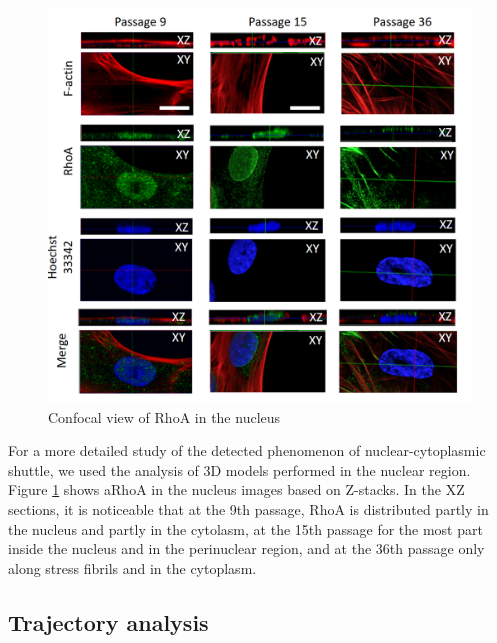 \documentclass[english,authoryear]{elsarticle}
\begin{document}
\begin{figure}
  \includegraphics[width=0.9\linewidth]{fig_rho-3d.png}
  \caption{Confocal view of RhoA in the nucleus}
  \label{rho-3d}
  \centering
\end{figure}

For a more detailed study of the detected phenomenon of nuclear-cytoplasmic shuttle, we used the analysis of 3D models performed in the nuclear region.
Figure \ref{rho-3d} shows aRhoA in the nucleus images based on Z-stacks.
In the XZ sections, it is noticeable that at the 9th passage, RhoA is distributed partly in the nucleus and partly in the cytolasm, at the 15th passage for the most part inside the nucleus and in the perinuclear region, and at the 36th passage only along stress fibrils and in the cytoplasm.

\subsection{Trajectory analysis}
\end{document}
